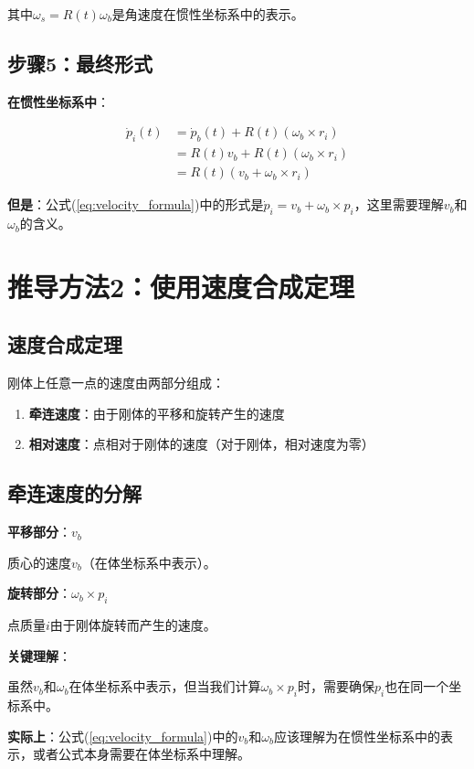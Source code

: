 \documentclass[12pt,a4paper]{article}
\begin{document}
其中$\omega_s = R(t) \omega_b$是角速度在惯性坐标系中的表示。

\subsection{步骤5：最终形式}

\textbf{在惯性坐标系中}：

\begin{align}
\dot{p}_i(t) &= \dot{p}_b(t) + R(t) (\omega_b \times r_i) \\
&= R(t) v_b + R(t) (\omega_b \times r_i) \\
&= R(t) (v_b + \omega_b \times r_i)
\end{align}

\textbf{但是}：公式(\ref{eq:velocity_formula})中的形式是$\dot{p}_i = v_b + \omega_b \times p_i$，这里需要理解$v_b$和$\omega_b$的含义。

\section{推导方法2：使用速度合成定理}

\subsection{速度合成定理}

刚体上任意一点的速度由两部分组成：
\begin{enumerate}
\item \textbf{牵连速度}：由于刚体的平移和旋转产生的速度
\item \textbf{相对速度}：点相对于刚体的速度（对于刚体，相对速度为零）
\end{enumerate}

\subsection{牵连速度的分解}

\textbf{平移部分}：$v_b$

质心的速度$v_b$（在体坐标系中表示）。

\textbf{旋转部分}：$\omega_b \times p_i$

点质量$i$由于刚体旋转而产生的速度。

\textbf{关键理解}：

虽然$v_b$和$\omega_b$在体坐标系中表示，但当我们计算$\omega_b \times p_i$时，需要确保$p_i$也在同一个坐标系中。

\textbf{实际上}：公式(\ref{eq:velocity_formula})中的$v_b$和$\omega_b$应该理解为在惯性坐标系中的表示，或者公式本身需要在体坐标系中理解。
\end{document}
